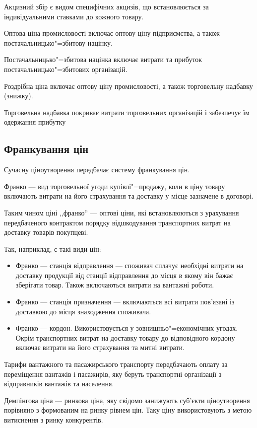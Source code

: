 \documentclass[a5paper,10pt,notitlepage,pdftex,headsepline]{scrartcl}
\begin{document}
    Акцизний збір є видом специфічних акцизів, що встановлюється за
    індивідуальними ставками до кожного товару.

    Оптова ціна промисловості включає оптову ціну підприємства, а також
    постачальницько"=збитову націнку.

    Постачальницько"=збитова націнка включає витрати та прибуток
    постачальницько"=збитових організацій.

    Роздрібна ціна включає оптову ціну промисловості, а також торговельну
    надбавку (знижку).

    Торговельна надбавка покриває витрати торговельних організацій і
    забезпечує їм одержання прибутку
  \subsection{Франкування цін}
    Сучасну ціноутворення передбачає систему франкування цін.

    Франко --- вид торговельної угоди купівлі"=продажу, коли в ціну товару
    включають витрати на його страхування та доставку у місце зазначене в
    договорі.

    Таким чином ціні ,,франко'' --- оптові ціни, які встановлюються з
    урахування передбаченого контрактом порядку відшкодування транспортних
    витрат на доставку товарів покупцеві.

    Так, наприклад, є такі види цін:
    \begin{itemize}
      \item Франко --- станція відправлення --- споживач сплачує необхідні витрати
        на доставку продукції від станції відправлення до місця в якому він
        бажає зберігати товар.
        Також включаються витрати на вантажні роботи.
      \item Франко --- станція призначення --- включаються всі витрати
        пов’язані із доставкою до місця знаходження споживача.
      \item Франко --- кордон.
        Використовується у зовнишньо"=економічних угодах.
        Окрім транспортних витрат на доставку товару до відповідного кордону
        включає витрати на його страхування та митні витрати.
    \end{itemize}

    Тарифи вантажного та пасажирського транспорту передбачають оплату за
    переміщення вантажів і пасажирів, яку беруть транспортні організації з
    відправників вантажів та населення.

    Демпінгова ціна --- ринкова ціна, яку свідомо занижують суб’єкти
    ціноутворення порівняно з формованим на ринку рівнем цін.
    Таку ціну використовують з метою витиснення з ринку конкурентів.
\end{document}

